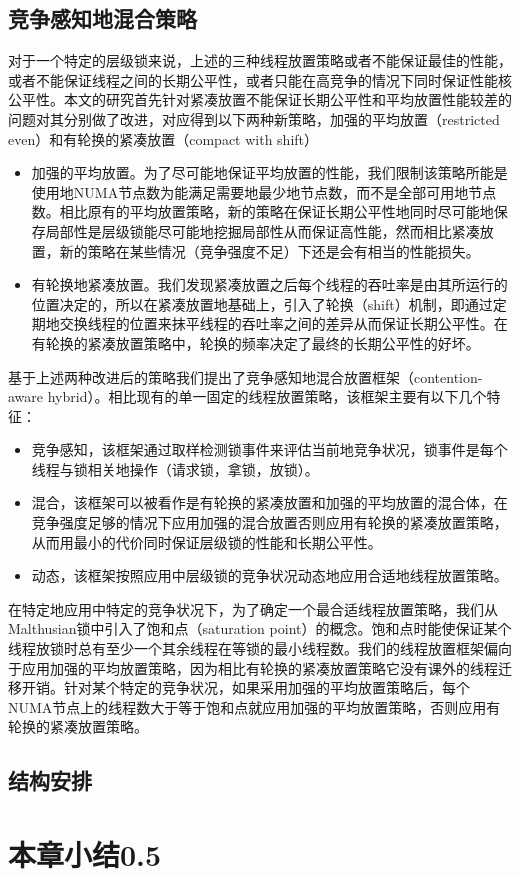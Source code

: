 \subsection{竞争感知地混合策略}
对于一个特定的层级锁来说，上述的三种线程放置策略或者不能保证最佳的性能，或者不能保证线程之间的长期公平性，或者只能在高竞争的情况下同时保证性能核公平性。本文的研究首先针对紧凑放置不能保证长期公平性和平均放置性能较差的问题对其分别做了改进，对应得到以下两种新策略，加强的平均放置（restricted even）和有轮换的紧凑放置（compact with shift）
\begin{itemize}
\item 加强的平均放置。为了尽可能地保证平均放置的性能，我们限制该策略所能是使用地NUMA节点数为能满足需要地最少地节点数，而不是全部可用地节点数。相比原有的平均放置策略，新的策略在保证长期公平性地同时尽可能地保存局部性是层级锁能尽可能地挖掘局部性从而保证高性能，然而相比紧凑放置，新的策略在某些情况（竞争强度不足）下还是会有相当的性能损失。
\item 有轮换地紧凑放置。我们发现紧凑放置之后每个线程的吞吐率是由其所运行的位置决定的，所以在紧凑放置地基础上，引入了轮换（shift）机制，即通过定期地交换线程的位置来抹平线程的吞吐率之间的差异从而保证长期公平性。在有轮换的紧凑放置策略中，轮换的频率决定了最终的长期公平性的好坏。
\end{itemize}

基于上述两种改进后的策略我们提出了竞争感知地混合放置框架（contention-aware hybrid）。相比现有的单一固定的线程放置策略，该框架主要有以下几个特征：
\begin{itemize}
\item 竞争感知，该框架通过取样检测锁事件来评估当前地竞争状况，锁事件是每个线程与锁相关地操作（请求锁，拿锁，放锁）。
\item 混合，该框架可以被看作是有轮换的紧凑放置和加强的平均放置的混合体，在竞争强度足够的情况下应用加强的混合放置否则应用有轮换的紧凑放置策略，从而用最小的代价同时保证层级锁的性能和长期公平性。
\item 动态，该框架按照应用中层级锁的竞争状况动态地应用合适地线程放置策略。
\end{itemize}

在特定地应用中特定的竞争状况下，为了确定一个最合适线程放置策略，我们从Malthusian锁中引入了饱和点（saturation point）的概念。饱和点时能使保证某个线程放锁时总有至少一个其余线程在等锁的最小线程数。我们的线程放置框架偏向于应用加强的平均放置策略，因为相比有轮换的紧凑放置策略它没有课外的线程迁移开销。针对某个特定的竞争状况，如果采用加强的平均放置策略后，每个NUMA节点上的线程数大于等于饱和点就应用加强的平均放置策略，否则应用有轮换的紧凑放置策略。
\subsection{结构安排}
\section{本章小结0.5}